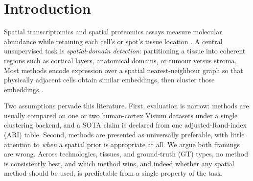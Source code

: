 \documentclass[journal]{IEEEtran}
\begin{document}
\IEEEpeerreviewmaketitle

\section{Introduction}
Spatial transcriptomics and spatial proteomics assays measure molecular abundance while retaining each
cell's or spot's tissue location \citep{stahl2016st,moffitt2018merfish}. A central unsupervised task is
\emph{spatial-domain detection}: partitioning a tissue into coherent regions such as cortical layers,
anatomical domains, or tumour versus stroma. Most methods encode expression over a spatial nearest-neighbour graph so
that physically adjacent cells obtain similar embeddings, then cluster those embeddings
\citep{dong2022stagate,xu2024sedr,long2023graphst,ren2022spaceflow,hu2021spagcn}.

Two assumptions pervade this literature. First, evaluation is narrow: methods are usually compared
on one or two human-cortex Visium datasets \citep{maynard2021dlpfc} under a single clustering backend, and
a SOTA claim is declared from one adjusted-Rand-index (ARI) table. Second, methods are presented as
universally preferable, with little attention to \emph{when} a spatial prior is appropriate at all.
We argue both framings are wrong. Across technologies, tissues, and ground-truth (GT) types, no method is
consistently best, and which method wins, and indeed whether any spatial method should be used, is
predictable from a single property of the task.
\end{document}
